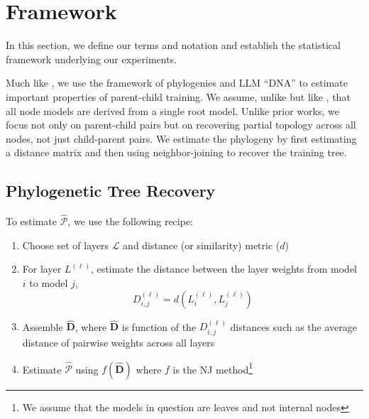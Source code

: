 \documentclass{article}
\begin{document}
\section{Framework}
\label{sec:framework}

In this section, we define our terms and notation and establish the statistical framework underlying our experiments.


Much like \citep{wu2026llmdna}, we use the framework of phylogenies and LLM ``DNA'' to estimate important properties of parent-child training. We assume, unlike \cite{} but like \citep{yu2025neural}, that all node models are derived from a single root model. Unlike prior works, we focus not only on parent-child pairs but on recovering partial topology across all nodes, not just child-parent pairs.  We estimate the phylogeny by first estimating a distance matrix and then using neighbor-joining \citep{saitou1987neighbor} to recover the training tree.


\subsection{Phylogenetic Tree Recovery}
\label{sec:framework:phylo}

To estimate $\widehat{\mathcal{P}}$, we use the following recipe:

\begin{enumerate}
    \item Choose set of layers $\mathcal{L}$ and distance (or similarity) metric ($d$)
    \item For layer $L^{(\ell)}$, estimate the distance between the layer weights from model $i$ to model $j$,
    $$
    D_{i,j}^{(\ell)} = d(L^{(\ell)}_i, L^{(\ell)}_j)
    $$
    \item Assemble $\hat{\textbf{D}}$, where $\hat{\textbf{D}}$ is function of the $D_{i,j}^{(\ell)}$ distances such as the average distance of pairwise weights across all layers
    \item Estimate $\widehat{{\mathcal{P}}}$ using $f(\hat{\textbf{D}})$ where $f$ is the NJ method\footnote{We assume that the models in question are leaves and not internal nodes}
\end{enumerate}
\end{document}
